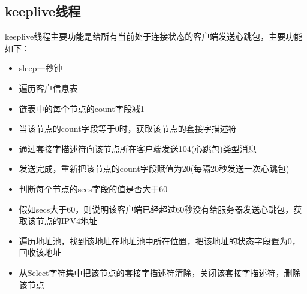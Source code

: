 \subsection{keeplive线程}
keeplive线程主要功能是给所有当前处于连接状态的客户端发送心跳包，主要功能如下：
\begin{itemize}
  \item sleep一秒钟
  \item 遍历客户信息表
  \item 链表中的每个节点的count字段减1
  \item 当该节点的count字段等于0时，获取该节点的套接字描述符
  \item 通过套接字描述符向该节点所在客户端发送104(心跳包)类型消息
  \item 发送完成，重新把该节点的count字段赋值为20(每隔20秒发送一次心跳包)
  \item 判断每个节点的secs字段的值是否大于60
  \item 假如secs大于60，则说明该客户端已经超过60秒没有给服务器发送心跳包，获取该节点的IPV4地址
  \item 遍历地址池，找到该地址在地址池中所在位置，把该地址的状态字段置为0，回收该地址
  \item 从Select字符集中把该节点的套接字描述符清除，关闭该套接字描述符，删除该节点
\end{itemize}

